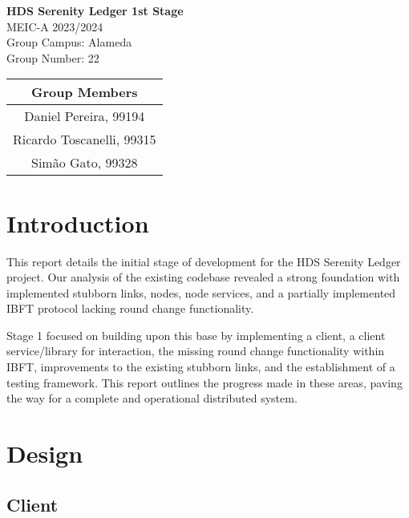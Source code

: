 \documentclass[12pt]{article}
\begin{document}
\begin{titlepage}
    \vspace*{\fill}
    \centering
    \LARGE\textbf{HDS Serenity Ledger 1st Stage}\\
    \vspace{2em}
    \LARGE
    MEIC-A 2023/2024\\
    Group Campus: Alameda\\
    Group Number: 22\\
    \vspace{2em}
    \begin{tabular}{|c|}
        \hline
        Group Members\\
        \hline
        Daniel Pereira, 99194\\
        Ricardo Toscanelli, 99315\\
        Simão Gato, 99328\\
        \hline
    \end{tabular}
    \vspace{2em}
    \vspace*{\fill}
\end{titlepage}

\tableofcontents
\newpage

\section{Introduction}
This report details the initial stage of development for the HDS Serenity Ledger project. Our analysis of the existing codebase revealed a strong foundation with implemented stubborn links, nodes, node services, and a partially implemented IBFT protocol lacking round change functionality.

Stage 1 focused on building upon this base by implementing a client, a client service/library for interaction, the missing round change functionality within IBFT, improvements to the existing stubborn links, and the establishment of a testing framework. This report outlines the progress made in these areas, paving the way for a complete and operational distributed system.

\section{Design}

\subsection{Client}
\end{document}
